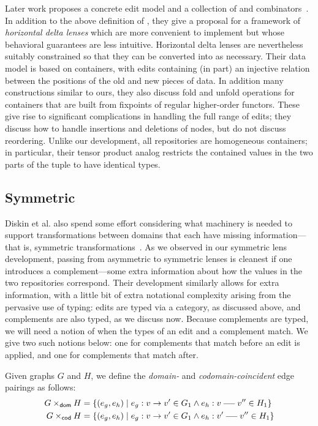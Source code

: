 Later work proposes a concrete edit model and a collection of \WBADLs and
combinators~\cite{Pacheco2012}. In addition to the above definition of
\WBADLs, they give a proposal for a framework of \emph{horizontal delta
lenses} which are more convenient to implement but whose behavioral
guarantees are less intuitive. Horizontal delta lenses are nevertheless
suitably constrained so that they can be converted into \WBADLs as
necessary. Their data model is based on containers, with edits containing
(in part) an injective relation between the positions of the old and new
pieces of data. In addition many constructions similar to ours, they also
discuss fold and unfold operations for containers that are built from
fixpoints of regular higher-order functors. These give rise to significant
complications in handling the full range of edits; they discuss how to
handle insertions and deletions of nodes, but do not discuss reordering.
Unlike our development, all repositories are homogeneous containers; in
particular, their tensor product analog restricts the contained values in
the two parts of the tuple to have identical types.

\subsection{Symmetric}
\label{sec:delta:symmetric}
Diskin et al. also spend some effort considering what machinery is needed to
support transformations between domains that each have missing
information---that is, symmetric transformations~\cite{Diskin-Delta11}. As
we observed in our symmetric lens development, passing from asymmetric to
symmetric lenses is cleanest if one introduces a complement---some extra
information about how the values in the two repositories correspond. Their
development similarly allows for extra information, with a little bit of
extra notational complexity arising from the pervasive use of typing: edits
are typed via a category, as discussed above, and complements are also
typed, as we discuss now. Because complements are typed, we will need a
notion of when the types of an edit and a complement match. We give two such
notions below: one for complements that match before an edit is applied, and
one for complements that match after.

\begin{definition}
    Given graphs $G$ and $H$, we define the \emph{domain-} and
    \emph{codomain-coincident} edge pairings as follows:
    \begin{align*}
        G \domco H &= \{(e_g,e_h) \mid e_g : v \dedge v' \in G_1 \land e_h :
        v \uedge v'' \in H_1\} \\
        G \codco H &= \{(e_g,e_h) \mid e_g : v \dedge v' \in G_1 \land e_h :
        v' \uedge v'' \in H_1\}
    \end{align*}
\end{definition}


